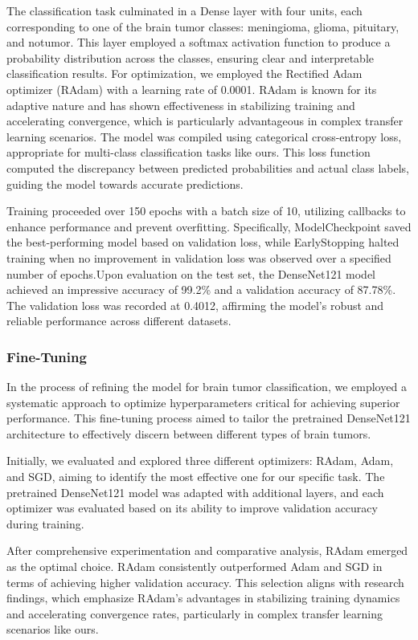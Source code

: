 The classification task culminated in a Dense layer with four units\cite{Thunuguntla_S}, each corresponding to one of the brain tumor classes: meningioma, glioma, pituitary, and notumor. This layer employed a softmax activation function to produce a probability distribution across the classes, ensuring clear and interpretable classification results. For optimization, we employed the Rectified Adam optimizer (RAdam) with a learning rate of 0.0001. RAdam is known for its adaptive nature and has shown effectiveness in stabilizing training and accelerating convergence, which is particularly advantageous in complex transfer learning scenarios. The model was compiled using categorical cross-entropy loss, appropriate for multi-class classification tasks like ours. This loss function computed the discrepancy between predicted probabilities and actual class labels, guiding the model towards accurate predictions.

Training proceeded over 150 epochs with a batch size of 10, utilizing callbacks to enhance performance and prevent overfitting. Specifically, ModelCheckpoint saved the best-performing model based on validation loss, while EarlyStopping halted training when no improvement in validation loss was observed over a specified number of epochs.Upon evaluation on the test set, the DenseNet121 model achieved an impressive accuracy of 99.2\% and a validation accuracy of 87.78\%. The validation loss was recorded at 0.4012, affirming the model's robust and reliable performance across different datasets.

\subsubsection{Fine-Tuning}

In the process of refining the model for brain tumor classification, we employed a systematic approach to optimize hyperparameters critical for achieving superior performance. This fine-tuning process aimed to tailor the pretrained DenseNet121 architecture to effectively discern between different types of brain tumors.

Initially, we evaluated and explored three different optimizers: RAdam\cite{Tanner_2021}, Adam, and SGD, aiming to identify the most effective one for our specific task. The pretrained DenseNet121 model was adapted with additional layers, and each optimizer was evaluated based on its ability to improve validation accuracy during training.

After comprehensive experimentation and comparative analysis, RAdam emerged as the optimal choice. RAdam consistently outperformed Adam and SGD in terms of achieving higher validation accuracy. This selection aligns with research findings, which emphasize RAdam's advantages in stabilizing training dynamics and accelerating convergence rates, particularly in complex transfer learning scenarios like ours.

